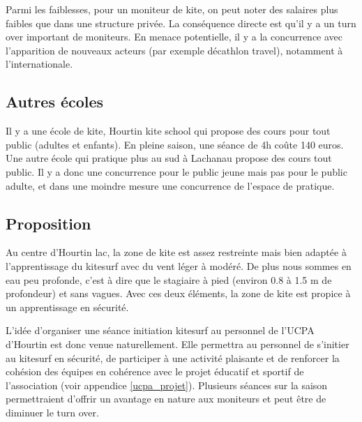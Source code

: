 \documentclass[11pt,a4paper]{report}
\begin{document}
Parmi les faiblesses, pour un moniteur de kite, on peut noter des
salaires plus faibles que dans une structure privée. 
La conséquence directe est qu'il y a un turn over important de moniteurs.
En menace potentielle, il y a  la concurrence avec 
l’apparition de nouveaux acteurs (par exemple décathlon travel),
notamment à l'internationale. 

\subsection{Autres écoles}

Il y a une école de kite, Hourtin kite school
qui propose des cours pour tout public (adultes et enfants). 
En pleine saison, une séance de 4h co\^ute 140 euros.
Une autre école qui pratique plus au sud à Lachanau propose
des cours tout public.
Il y a donc une concurrence pour le public jeune mais pas pour le public
adulte, et dans une moindre mesure une concurrence de l'espace de pratique.

\subsection{Proposition}


Au centre d'Hourtin lac, la zone de kite est assez restreinte 
mais bien adaptée à l'apprentissage
du kitesurf avec du vent léger à modéré. De plus nous sommes en 
eau peu profonde, c'est à dire que le stagiaire à pied (environ 0.8 à 1.5 m
de profondeur) et sans vagues. Avec ces deux éléments, la zone de kite 
est propice à un apprentissage en sécurité.


L'idée d'organiser une séance initiation kitesurf
au personnel de l'UCPA d'Hourtin est donc venue naturellement.
Elle permettra au personnel de s'initier au kitesurf en 
sécurité, de participer à une activité plaisante
et de renforcer la cohésion des équipes en cohérence avec le 
projet éducatif et sportif de l'association (voir appendice \ref{ucpa_projet}). 
Plusieurs séances sur la saison permettraient
d'offrir un avantage en nature aux moniteurs et peut \^etre 
de diminuer le turn over. 
\end{document}
